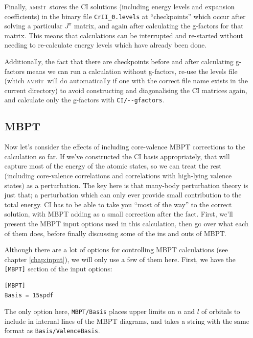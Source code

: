 \documentclass{report}
\newcommand{\ambit}{\textsc{amb}{\footnotesize i}\textsc{t}}
\begin{document}
Finally, \ambit\  stores the CI solutions (including energy levels and expansion coefficients) in the 
binary file \texttt{CrII\_0.levels} at ``checkpoints'' which occur after solving a particular $J^{\pi}$ 
matrix, and again after calculating the g-factors for that matrix. This means that calculations can be
interrupted and re-started without needing to re-calculate energy levels which have already been done.

Additionally, the fact that there are checkpoints before and after calculating g-factors means we can
run a calculation without g-factors, re-use the levels file (which \ambit\  will do automatically if one 
with the correct file name exists in the current directory) to avoid constructing and diagonalising 
the CI matrices again, and calculate only the g-factors with \texttt{CI/{-}{-}gfactors}.

\subsection{MBPT}

Now let's consider the effects of including core-valence MBPT corrections to the calculation so far. If 
we've constructed the CI basis appropriately, that will capture most of the energy of the atomic states,
so we can treat the rest (including core-valence correlations and correlations with high-lying valence 
states) as a perturbation. The key here is that many-body perturbation theory is just that; a 
perturbation which can only ever provide small contribution to the total energy. CI has to be able to 
take you ``most of the way'' to the correct solution, with MBPT adding as a small correction after the 
fact. First, we'll present the MBPT input options used in this calculation, then go over what each of 
them does, before finally discussing some of the ins and outs of MBPT.

Although there are a lot of options for controlling MBPT calculations (see chapter \ref{chap:input}), we
will only use a few of them here. First, we have the \texttt{[MBPT]} section of the input options:

\begin{verbatim}
[MBPT]
Basis = 15spdf
\end{verbatim}

The only option here, \texttt{MBPT/Basis} places upper limits on $n$ and $l$ of orbitals to include in
internal lines of the MBPT diagrams, and takes a string with the same format as
\texttt{Basis/ValenceBasis}.
\end{document}

